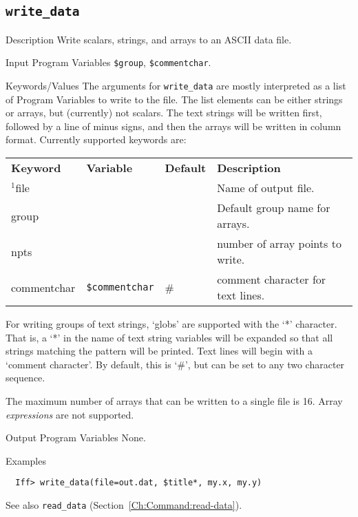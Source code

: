 \relax\par\vfill
\subsection{\texttt{write\_data}}
    \label{Ch:Command:write-data}

\begin{IFFcom}
\item[Description] Write scalars, strings, and arrays to an ASCII data
  file.
\item[Input Program Variables] {\tt{\$group}}, {\tt{\$commentchar}}.
\item[Keywords/Values]  The arguments for {\texttt{write\_data}} are
  mostly interpreted as a list of Program Variables to write to the file.
  The list elements can be either strings or arrays, but (currently) not
  scalars.  The text strings will be written first, followed by a line of
  minus signs, and then the arrays will be written in column format.
  Currently supported keywords are: 
  {\par\noindent\relax}
  \begin{tabular}{llll}
    \textbf{Keyword} & \textbf{Variable} & \textbf{Default} &
    \textbf{Description}\\
    \noalign{\smallskip}
    ${}^{1}${file}   & & & {Name of output file.} \\ 
    {group}          & & & {Default group name for arrays.} \\ 
    npts             & & & {number of array points to write.}\\
    commentchar      &  {\tt{\$commentchar}} & {\#} &
        comment character for text lines.\\
  \end{tabular}

  {\relax \vspace{0.2truein}\relax}
  \noindent
  For writing groups of text strings, `globs' are supported with the `*'
  character.  That is, a `*' in the name of text string variables will be
  expanded so that all strings matching the pattern will be printed.
  Text lines will begin with a `comment character'.  By default, this is
  `\#', but can be set to any two character sequence.
  
  The maximum number of arrays that can be written to a single file is 16.
  Array {\emph{expressions}} are not supported.


\item[Output Program Variables] None.
\item[Examples] {\hspace{1.in} \vspace{-0.1truein} \relax }
\begin{verbatim} 
  Iff> write_data(file=out.dat, $title*, my.x, my.y)
\end{verbatim}
\item[See also] 
{\texttt{read\_data}} (Section~\ref{Ch:Command:read-data}).
\end{IFFcom}


